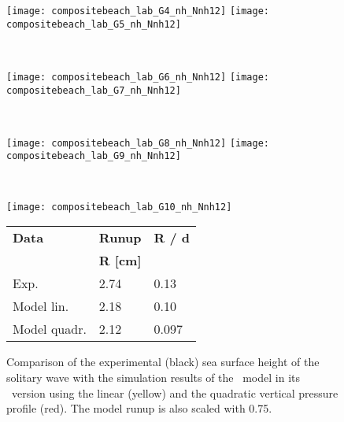 \begin{figure}[htbp]
\begin{minipage}{\textwidth}
\texttt{[image: compositebeach\_lab\_G4\_nh\_Nnh12]}
\texttt{[image: compositebeach\_lab\_G5\_nh\_Nnh12]}
\end{minipage} \\
\begin{minipage}{\textwidth}
\texttt{[image: compositebeach\_lab\_G6\_nh\_Nnh12]}
\texttt{[image: compositebeach\_lab\_G7\_nh\_Nnh12]}
\end{minipage} \\
\begin{minipage}{\textwidth}
\texttt{[image: compositebeach\_lab\_G8\_nh\_Nnh12]}
\texttt{[image: compositebeach\_lab\_G9\_nh\_Nnh12]}
\end{minipage} \\
\begin{minipage}{0.48\textwidth}
\texttt{[image: compositebeach\_lab\_G10\_nh\_Nnh12]}
\end{minipage} 
\begin{minipage}{0.45\textwidth}
\begin{tabular}{lll}
\textbf{Data} & \textbf{Runup} & \textbf{R / d} \\
              & \textbf{R [cm]} &  \\
\toprule
Exp.  &  2.74   &  0.13 \\
Model lin.&  2.18   &  0.10 \\
Model quadr.&  2.12   &  0.097 \\
\end{tabular}
\end{minipage}
\caption{Comparison of the experimental (black) sea surface height of the
solitary wave with the simulation results of the \nh\ model in its \nh\ version using the linear (yellow) and the quadratic vertical pressure profile (red). The model runup is also scaled with 0.75.}
\label{fig:nh_compositebeach_lab_nh_Nnh12}
\end{figure}

